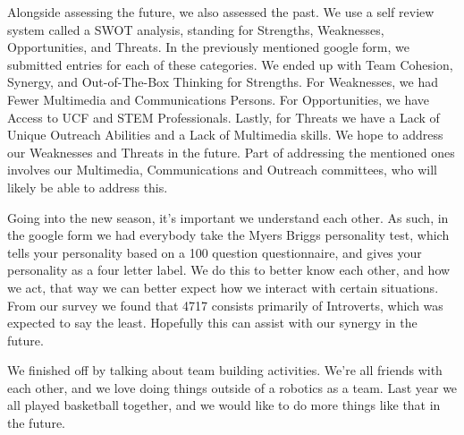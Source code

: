Alongside assessing the future, we also assessed the past. We use a self review system called a SWOT analysis, standing for Strengths, Weaknesses, Opportunities, and Threats. In the previously mentioned google form, we submitted entries for each of these categories. We ended up with Team Cohesion,  Synergy, and Out-of-The-Box Thinking for Strengths. For Weaknesses, we had Fewer Multimedia and Communications Persons. For Opportunities, we have Access to UCF and STEM Professionals. Lastly, for Threats we have a Lack of Unique Outreach Abilities and a Lack of Multimedia skills. We hope to address our Weaknesses and Threats in the future. Part of addressing the mentioned ones involves our Multimedia, Communications and Outreach committees, who will likely be able to address this.

Going into the new season, it's important we understand each other. As such, in the google form we had everybody take the Myers Briggs personality test, which tells your personality based on a 100 question questionnaire, and gives your personality as a four letter label. We do this to better know each other, and how we act, that way we can better expect how we interact with certain situations. From our survey we found that 4717 consists primarily of Introverts, which was expected to say the least. Hopefully this can assist with our synergy in the future.

We finished off by talking about team building activities. We're all friends with each other, and we love doing things outside of a robotics as a team. Last year we all played basketball together, and we would like to do more things like that in the future.


